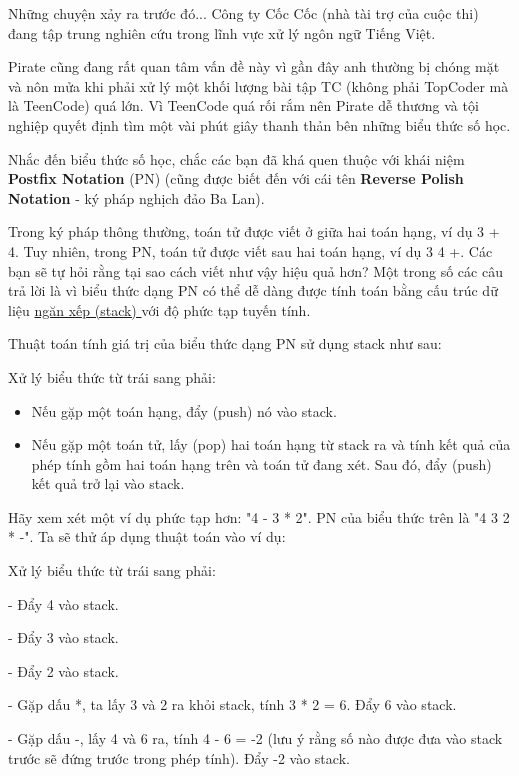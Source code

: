 Những chuyện xảy ra trước đó...
Công ty Cốc Cốc (nhà tài trợ của cuộc thi) đang tập trung nghiên cứu trong lĩnh vực xử lý ngôn ngữ Tiếng Việt.  

   Pirate cũng đang rất quan tâm vấn đề này vì gần đây anh thường bị chóng mặt và nôn mửa khi phải xử lý một khối lượng bài tập TC (không phải TopCoder mà là TeenCode) quá lớn. Vì TeenCode quá rối rắm nên Pirate dễ thương và tội nghiệp quyết định tìm một vài phút giây thanh thản bên những biểu thức số học.  

   Nhắc đến biểu thức số học, chắc các bạn đã khá quen thuộc với khái niệm   \textbf{    Postfix Notation   }   (PN) (cũng được biết đến với cái tên   \textbf{    Reverse Polish Notation   }   - ký pháp nghịch đảo Ba Lan).  

   Trong ký pháp thông thường, toán tử được viết ở giữa hai toán hạng, ví dụ 3 + 4. Tuy nhiên, trong PN, toán tử được viết sau hai toán hạng, ví dụ 3 4 +. Các bạn sẽ tự hỏi rằng tại sao cách viết như vậy hiệu quả hơn? Một trong số các câu trả lời là vì biểu thức dạng PN có thể dễ dàng được tính toán bằng cấu trúc dữ liệu   \href{http://www.cosc.canterbury.ac.nz/mukundan/dsal/StackAppl.html}{    ngăn xếp (stack)   }   với độ phức tạp tuyến tính.  

   Thuật toán tính giá trị của biểu thức dạng PN sử dụng stack như sau:  

Xử lý biểu thức từ trái sang phải:
\begin{itemize}
	\item Nếu gặp một toán hạng, đẩy (push) nó vào stack.
	\item Nếu gặp một toán tử, lấy (pop) hai toán hạng từ stack ra và tính kết quả của phép tính gồm hai toán hạng trên và toán tử đang xét. Sau đó, đẩy (push) kết quả trở lại vào stack.
\end{itemize}

   Hãy xem xét một ví dụ phức tạp hơn: "4 - 3 * 2". PN của biểu thức trên là "4 3 2 * -". Ta sẽ thử áp dụng thuật toán vào ví dụ:  

Xử lý biểu thức từ trái sang phải:

- Đẩy 4 vào stack.

- Đẩy 3 vào stack.

- Đẩy 2 vào stack.

- Gặp dấu *, ta lấy 3 và 2 ra khỏi stack, tính 3 * 2 = 6. Đẩy 6 vào stack.

- Gặp dấu -, lấy 4 và 6 ra, tính 4 - 6 = -2 (lưu ý rằng số nào được đưa vào stack trước sẽ đứng trước trong phép tính). Đẩy -2 vào stack.

